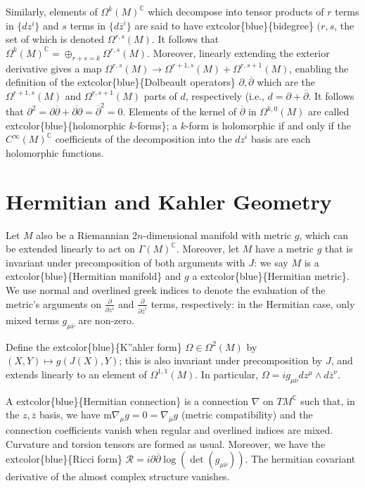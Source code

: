 \documentclass[
]{book}
\begin{document}
Similarly, elements of \(\Omega^k(M)^{\mathbb{C}}\) which decompose into tensor products of \(r\) terms in \(\{dz^i\}\) and \(s\) terms in \(\{d\overline{z}^i\}\) are said to have extcolor\{blue\}\{bidegree\} \((r,s\), the set of which is denoted \(\Omega^{r,s}(M)\).
It follows that \(\Omega^k(M)^{\mathbb{C}} = \oplus_{r+s=k} \Omega^{r,s}(M)\).
Moreover, linearly extending the exterior derivative gives a map \(\Omega^{r,s}(M) \to \Omega^{r+1,s}(M) + \Omega^{r,s+1}(M)\), enabling the definition of the extcolor\{blue\}\{Dolbeault operators\} \(\partial, \overline{\partial}\) which are the \(\Omega^{r+1,s}(M)\) and \(\Omega^{r,s+1}(M)\) parts of \(d\), respectively (i.e., \(d = \partial + \overline{\partial}\).
It follows that \(\partial^2 = \partial\overline{\partial} + \overline{\partial\partial} = \overline{\partial}^2 = 0\).
Elements of the kernel of \(\overline{\partial}\) in \(\Omega^{k,0}(M)\) are called extcolor\{blue\}\{holomorphic \(k\)-forms\}; a \(k\)-form is holomorphic if and only if the \(C^\infty(M)^{\mathbb{C}}\) coefficients of the decomposition into the \(dz^i\) basis are each holomorphic functions.

\hypertarget{hermitian-and-kahler-geometry}{%
\section{Hermitian and Kahler Geometry}\label{hermitian-and-kahler-geometry}}

Let \(M\) also be a Riemannian \(2n\)-dimensional manifold with metric \(g\), which can be extended linearly to act on \(\Gamma(M)^{\mathbb{C}}\).
Moreover, let \(M\) have a metric \(g\) that is invariant under precomposition of both arguments with \(J\): we say \(M\) is a extcolor\{blue\}\{Hermitian manifold\} and \(g\) a extcolor\{blue\}\{Hermitian metric\}.
We use normal and overlined greek indices to denote the evaluation of the metric's arguments on \(\frac{\partial}{\partial z^i}\) and \(\frac{\partial}{\partial \overline{z}^i}\) terms, respectively: in the Hermitian case, only mixed terms \(g_{\mu\overline{\nu}}\) are non-zero.

Define the extcolor\{blue\}\{K''ahler form\} \(\Omega \in \Omega^2(M)\) by \((X, Y) \mapsto g(J(X), Y)\); this is also invariant under precomposition by \(J\), and extends linearly to an element of \(\Omega^{1,1}(M)\).
In particular, \(\Omega = ig_{\mu\overline{\nu}} dz^\mu \wedge d\overline{z}^\nu\).

A extcolor\{blue\}\{Hermitian connection\} is a connection \(\nabla\) on \(TM^{\mathbb{C}}\) such that, in the \(z,\overline{z}\) basis, we have m\(\nabla_\mu g = 0 = \nabla_{\overline{\mu}} g\) (metric compatibility) and the connection coefficients vanish when regular and overlined indices are mixed.
Curvature and torsion tensors are formed as usual.
Moreover, we have the extcolor\{blue\}\{Ricci form\} \(\mathcal{R} = i \partial \overline{\partial} \log(\det(g_{\mu\overline{\nu}}))\).
The hermitian covariant derivative of the almost complex structure vanishes.
\end{document}
